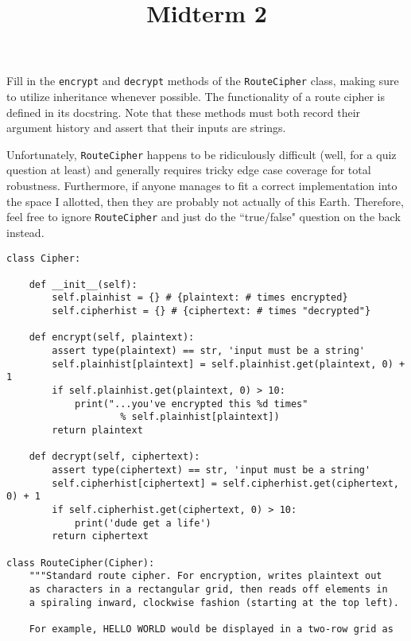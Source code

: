 \documentclass[twoside]{article}
\title{\sc Midterm 2}
\begin{document}
\thispagestyle{empty}
\maketitle

\begin{enumerate}

Fill in the \texttt{encrypt} and \texttt{decrypt} methods of the \texttt{RouteCipher} class, making sure to utilize inheritance whenever possible. The functionality of a route cipher is defined in its docstring. Note that these methods must both record their argument history and assert that their inputs are strings.

Unfortunately, \texttt{RouteCipher} happens to be ridiculously difficult (well, for a quiz question at least) and generally requires tricky edge case coverage for total robustness. Furthermore, if anyone manages to fit a correct implementation into the space I allotted, then they are probably not actually of this Earth. Therefore, feel free to ignore \texttt{RouteCipher} and just do the ``true/false" question on the back instead.
\vspace{0.1in}

\begin{lstlisting}
class Cipher:

    def __init__(self):
        self.plainhist = {} # {plaintext: # times encrypted}
        self.cipherhist = {} # {ciphertext: # times "decrypted"}
        
    def encrypt(self, plaintext):
        assert type(plaintext) == str, 'input must be a string'
        self.plainhist[plaintext] = self.plainhist.get(plaintext, 0) + 1
        if self.plainhist.get(plaintext, 0) > 10:
            print("...you've encrypted this %d times"
                    % self.plainhist[plaintext])
        return plaintext
    
    def decrypt(self, ciphertext):
        assert type(ciphertext) == str, 'input must be a string'
        self.cipherhist[ciphertext] = self.cipherhist.get(ciphertext, 0) + 1
        if self.cipherhist.get(ciphertext, 0) > 10:
            print('dude get a life')
        return ciphertext

class RouteCipher(Cipher):
    """Standard route cipher. For encryption, writes plaintext out
    as characters in a rectangular grid, then reads off elements in
    a spiraling inward, clockwise fashion (starting at the top left).
    
    For example, HELLO WORLD would be displayed in a two-row grid as
    

\end{lstlisting}
\end{enumerate}
\end{document}
